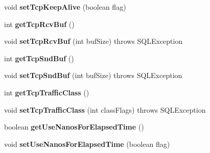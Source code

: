 \begin{DoxyCompactItemize}
void {\bfseries set\+Tcp\+Keep\+Alive} (boolean flag)
\item 
\mbox{\label{classcom_1_1mysql_1_1jdbc_1_1_connection_properties_impl_a11efdd156a76d98e4101b370b9d111b6}} 
int {\bfseries get\+Tcp\+Rcv\+Buf} ()
\item 
\mbox{\label{classcom_1_1mysql_1_1jdbc_1_1_connection_properties_impl_ae703f338903372c9dfae504364596bf0}} 
void {\bfseries set\+Tcp\+Rcv\+Buf} (int buf\+Size)  throws S\+Q\+L\+Exception 
\item 
\mbox{\label{classcom_1_1mysql_1_1jdbc_1_1_connection_properties_impl_aad2fc46150dbb1725c5da26850b1b428}} 
int {\bfseries get\+Tcp\+Snd\+Buf} ()
\item 
\mbox{\label{classcom_1_1mysql_1_1jdbc_1_1_connection_properties_impl_ae21db30f2f0f85d897ecb6ec9b324d8c}} 
void {\bfseries set\+Tcp\+Snd\+Buf} (int buf\+Size)  throws S\+Q\+L\+Exception 
\item 
\mbox{\label{classcom_1_1mysql_1_1jdbc_1_1_connection_properties_impl_aa761f87723f22e04cd3f7e6a2a55b10f}} 
int {\bfseries get\+Tcp\+Traffic\+Class} ()
\item 
\mbox{\label{classcom_1_1mysql_1_1jdbc_1_1_connection_properties_impl_a12a1cdc84034d6b61204110b2bcfac7a}} 
void {\bfseries set\+Tcp\+Traffic\+Class} (int class\+Flags)  throws S\+Q\+L\+Exception 
\item 
\mbox{\label{classcom_1_1mysql_1_1jdbc_1_1_connection_properties_impl_adb81af0fb8c5882aa800735ee781bbdb}} 
boolean {\bfseries get\+Use\+Nanos\+For\+Elapsed\+Time} ()
\item 
\mbox{\label{classcom_1_1mysql_1_1jdbc_1_1_connection_properties_impl_a71dce55fcd2ed15defd652a6b28f7231}} 
void {\bfseries set\+Use\+Nanos\+For\+Elapsed\+Time} (boolean flag)

\end{DoxyCompactItemize}
